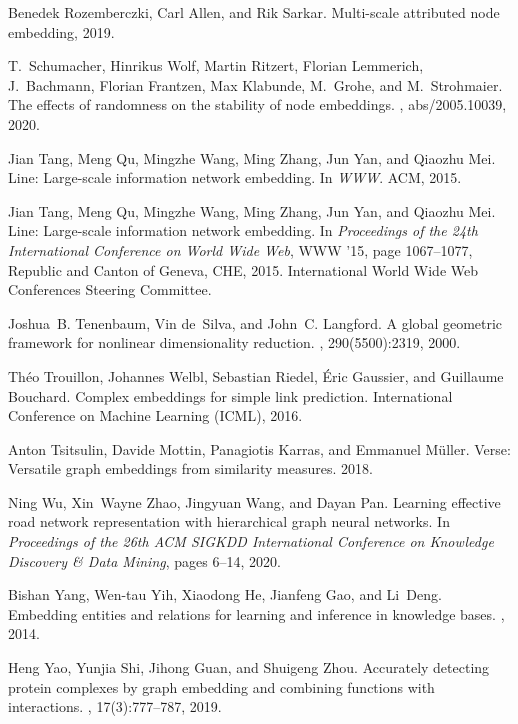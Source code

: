 \documentclass{IEEEtran}
\begin{document}
\begin{thebibliography}{00}
Benedek Rozemberczki, Carl Allen, and Rik Sarkar.
\newblock Multi-scale attributed node embedding, 2019.

T.~Schumacher, Hinrikus Wolf, Martin Ritzert, Florian Lemmerich, J.~Bachmann,
  Florian Frantzen, Max Klabunde, M.~Grohe, and M.~Strohmaier.
\newblock The effects of randomness on the stability of node embeddings.
, abs/2005.10039, 2020.

Jian Tang, Meng Qu, Mingzhe Wang, Ming Zhang, Jun Yan, and Qiaozhu Mei.
\newblock Line: Large-scale information network embedding.
\newblock In {\em WWW}. ACM, 2015.

Jian Tang, Meng Qu, Mingzhe Wang, Ming Zhang, Jun Yan, and Qiaozhu Mei.
\newblock Line: Large-scale information network embedding.
\newblock In {\em Proceedings of the 24th International Conference on World
  Wide Web}, WWW '15, page 1067–1077, Republic and Canton of Geneva, CHE,
  2015. International World Wide Web Conferences Steering Committee.

Joshua~B. Tenenbaum, Vin de~Silva, and John~C. Langford.
\newblock A global geometric framework for nonlinear dimensionality reduction.
, 290(5500):2319, 2000.

Th{\'e}o Trouillon, Johannes Welbl, Sebastian Riedel, {\'E}ric Gaussier, and
  Guillaume Bouchard.
\newblock Complex embeddings for simple link prediction.
\newblock International Conference on Machine Learning (ICML), 2016.

Anton Tsitsulin, Davide Mottin, Panagiotis Karras, and Emmanuel Müller.
\newblock Verse: Versatile graph embeddings from similarity measures.
 2018.

Ning Wu, Xin~Wayne Zhao, Jingyuan Wang, and Dayan Pan.
\newblock Learning effective road network representation with hierarchical
  graph neural networks.
\newblock In {\em Proceedings of the 26th ACM SIGKDD International Conference
  on Knowledge Discovery \& Data Mining}, pages 6--14, 2020.

Bishan Yang, Wen-tau Yih, Xiaodong He, Jianfeng Gao, and Li~Deng.
\newblock Embedding entities and relations for learning and inference in
  knowledge bases.
, 2014.

Heng Yao, Yunjia Shi, Jihong Guan, and Shuigeng Zhou.
\newblock Accurately detecting protein complexes by graph embedding and
  combining functions with interactions.
, 17(3):777--787, 2019.


\end{thebibliography}
\end{document}
